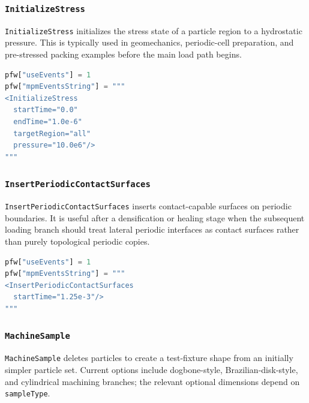 \subsubsection{\texttt{InitializeStress}}

\texttt{InitializeStress} initializes the stress state of a particle region to a hydrostatic pressure.  This is typically used in geomechanics, periodic-cell preparation, and pre-stressed packing examples before the main load path begins.

\begin{lstlisting}[language=Python,caption={Hydrostatic stress initialization event.}]
pfw["useEvents"] = 1
pfw["mpmEventsString"] = """
<InitializeStress
  startTime="0.0"
  endTime="1.0e-6"
  targetRegion="all"
  pressure="10.0e6"/>
"""
\end{lstlisting}

\subsubsection{\texttt{InsertPeriodicContactSurfaces}}

\texttt{InsertPeriodicContactSurfaces} inserts contact-capable surfaces on periodic boundaries.  It is useful after a densification or healing stage when the subsequent loading branch should treat lateral periodic interfaces as contact surfaces rather than purely topological periodic copies.

\begin{lstlisting}[language=Python,caption={Periodic-contact-surface insertion event.}]
pfw["useEvents"] = 1
pfw["mpmEventsString"] = """
<InsertPeriodicContactSurfaces
  startTime="1.25e-3"/>
"""
\end{lstlisting}

\subsubsection{\texttt{MachineSample}}

\texttt{MachineSample} deletes particles to create a test-fixture shape from an initially simpler particle set.  Current options include dogbone-style, Brazilian-disk-style, and cylindrical machining branches; the relevant optional dimensions depend on \texttt{sampleType}.

